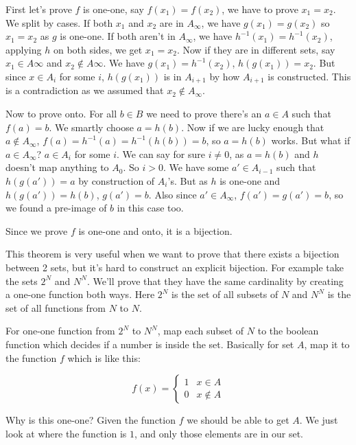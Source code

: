 \documentclass[a4paper,10pt]{article}
\theoremstyle{definition} %
\begin{document}
    First let's prove $f$ is one-one, say $f(x_1) = f(x_2)$, we have to prove $x_1 = x_2$. We 
    split by cases. If both $x_1$ and $x_2$ are in $A_\infty$, we have $g(x_1) = g(x_2)$
    so $x_1 = x_2$ as $g$ is one-one. If both aren't in $A_\infty$, we have $h^{-1}(x_1)
    = h^{-1}(x_2)$, applying $h$ on both sides, we get $x_1 = x_2$. Now if they are in different
    sets, say $x_1 \in A\infty$ and $x_2 \notin A\infty$. We have $g(x_1) = h^{-1}(x_2)$,
    $h(g(x_1)) = x_2$. But since $x \in A_i$ for some $i$, $h(g(x_1))$ is in $A_{i+1}$ by how 
    $A_{i+1}$ is constructed. This is a contradiction as we assumed that $x_2 \notin A_\infty$.

    Now to prove onto. For all $b \in B$ we need to prove there's an $a \in A$ such that $f(a) = b$.
    We smartly choose $a = h(b)$. Now if we are lucky enough that $a \notin A_\infty$, 
    $f(a) = h^{-1}(a) = h^{-1}(h(b)) = b$, so $a = h(b)$ works. But what if $a \in A_\infty$?
    $a \in A_i$ for some $i$. We can say for sure $i \neq 0$, as $a = h(b)$ and $h$ doesn't
    map anything to $A_0$. So $i > 0$. We have some $a' \in A_{i-1}$ such that $h(g(a')) = a$
    by construction of $A_i$'s. But as $h$ is one-one and $h(g(a')) = h(b)$, $g(a') = b$. Also 
    since $a' \in A_\infty$, $f(a') = g(a') = b$, so we found a pre-image of $b$ in this case too.

    Since we prove $f$ is one-one and onto, it is a bijection.

    This theorem is very useful when we want to prove that there exists a bijection between 2 sets,
    but it's hard to construct an explicit bijection. For example take the sets $2^N$ and $N^N$. We'll
    prove that they have the same cardinality by creating a one-one function both ways. Here $2^N$ 
    is the set of all subsets of $N$ and $N^N$ is the set of all functions from $N$ to $N$.

    For one-one function from $2^N$ to $N^N$, map each subset of $N$ to the boolean function which decides
    if a number is inside the set. Basically for set $A$, map it to the function $f$ which is like this:

    \begin{equation*}
        f(x)=
            \begin{cases}
                1 & x \in A \\
                0 & x \notin A
            \end{cases}
    \end{equation*}

    Why is this one-one? Given the function $f$ we should be able to get $A$. We just look at where the 
    function is $1$, and only those elements are in our set.
\end{document}
